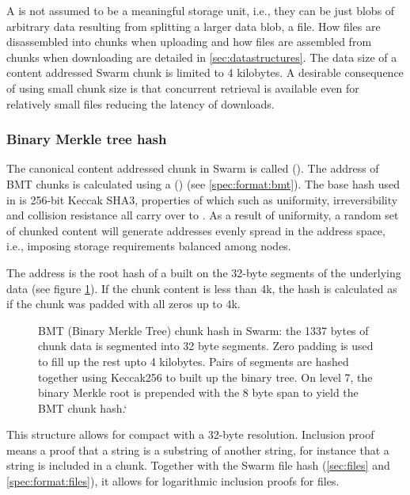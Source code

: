 A  is not assumed to be a meaningful storage unit, i.e., they can be just blobs of arbitrary data resulting from splitting a larger data blob, a file. How files are disassembled into chunks when uploading and how files are assembled from chunks when downloading are detailed in \ref{sec:datastructures}. The data size of a content addressed Swarm chunk is limited to 4 kilobytes. A desirable consequence of using small chunk size is that concurrent retrieval is available even for relatively small files reducing the latency of downloads. 

\subsubsection{Binary Merkle tree hash}

The canonical content addressed chunk in Swarm is called  ().
The address of BMT chunks is calculated using a  () (see \ref{spec:format:bmt}). The base hash used in  is 256-bit Keccak SHA3, properties of which such as uniformity, irreversibility and collision resistance all carry over to . As a result of uniformity, a random set of chunked content will generate addresses evenly spread in the address space, i.e., imposing storage requirements balanced among nodes.

The  address is the root hash of a  built on the  32-byte segments of the underlying data (see figure \ref{fig:BMT}). If the chunk content is less than 4k, the hash is calculated as if the chunk was padded with all zeros up to 4k. 



\begin{figure}[htbp]
   \centering
   
   \caption[BMT: Binary Merkle Tree hash used as chunk hash in Swarm]{BMT (Binary Merkle Tree) chunk hash in Swarm: the 1337 bytes of chunk data is segmented into 32 byte segments. Zero padding is used to fill up the rest upto 4 kilobytes. Pairs of segments are hashed together using Keccak256 to built up the binary tree. On level 7, the binary Merkle root is prepended with the 8 byte span to yield the BMT chunk hash.`}
   \label{fig:BMT}
\end{figure}

This structure  allows for compact  with a 32-byte resolution. Inclusion proof means a proof that a string is a substring of another string, for instance that a string is included in a chunk. Together with the Swarm file hash (\ref{sec:files} and \ref{spec:format:files}), it allows for logarithmic inclusion proofs for files. 

